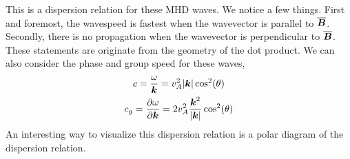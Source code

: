 \documentclass{article}
\begin{document}
This is a dispersion relation for these MHD waves. We notice a few things. First
and foremost, the wavespeed is fastest when the wavevector is parallel to
$\overline{\boldsymbol{B}}$. Secondly, there is no propagation when the wavevector is
perpendicular to $\overline{\boldsymbol{B}}$. These statements are originate from the
geometry of the dot product. We can also consider the phase and group speed for
these waves,
\begin{gather*}
    c = \frac{\omega}{\boldsymbol{k}} = v_A^2|\boldsymbol{k}|\cos^2(\theta)\\
    c_g = \frac{\partial \omega}{\partial \boldsymbol{k}} = 2 v_A^2 \frac{\boldsymbol{k}^2}{|\boldsymbol{k}|}\cos^2(\theta)
\end{gather*}
An interesting way to visualize this dispersion relation is a polar diagram of
the dispersion relation. 



\begin{gather*}
\end{gather*}
\end{document}

